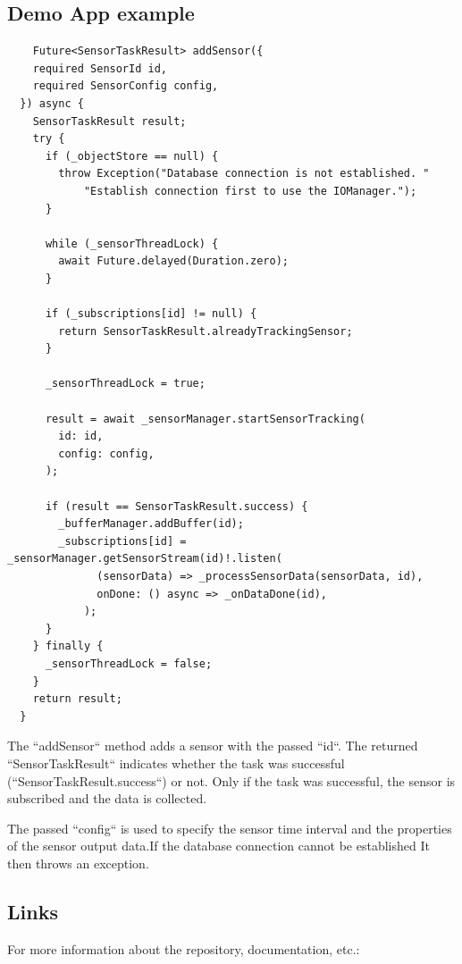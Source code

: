 \documentclass[12pt]{article}
\begin{document}
\subsection{Demo App example}
\begin{verbatim}
    Future<SensorTaskResult> addSensor({
    required SensorId id,
    required SensorConfig config,
  }) async {
    SensorTaskResult result;
    try {
      if (_objectStore == null) {
        throw Exception("Database connection is not established. "
            "Establish connection first to use the IOManager.");
      }

      while (_sensorThreadLock) {
        await Future.delayed(Duration.zero);
      }

      if (_subscriptions[id] != null) {
        return SensorTaskResult.alreadyTrackingSensor;
      }

      _sensorThreadLock = true;

      result = await _sensorManager.startSensorTracking(
        id: id,
        config: config,
      );

      if (result == SensorTaskResult.success) {
        _bufferManager.addBuffer(id);
        _subscriptions[id] = _sensorManager.getSensorStream(id)!.listen(
              (sensorData) => _processSensorData(sensorData, id),
              onDone: () async => _onDataDone(id),
            );
      }
    } finally {
      _sensorThreadLock = false;
    }
    return result;
  }
\end{verbatim}
The ``addSensor`` method adds a sensor with the passed ``id``. The returned ``SensorTaskResult`` indicates whether the task was successful (``SensorTaskResult.success``) or not. Only if the task was successful, the sensor is subscribed and the data is collected.

The passed ``config`` is used to specify the sensor time interval and the properties of the sensor output data.If the database connection cannot be established It then throws an exception.
\subsection{Links}
For more information about the repository, documentation, etc.:
\end{document}
